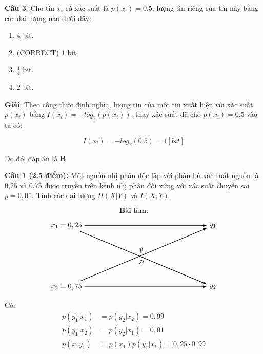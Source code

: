 \documentclass[12pt]{article}
\begin{document}
\newpage
\textbf{Câu 3}: Cho tin $x_i$ có xác suất là $p(x_i)=0.5$, lượng tin riêng của tin này bằng các đại lượng nào dưới đây:

 \begin{enumerate}[label=\Alph*.]
    \item $4$ bit.
    \item (CORRECT) $1$ bit.
    \item $\frac{1}{4}$ bit.
    \item $2$ bit.
 \end{enumerate}


\textbf{Giải}: Theo công thức định nghĩa, lượng tin của một tin xuất hiện với xác suất $p(x_i)$ bằng $I(x_i)=-log_2(p(x_i))$, thay xác suất đã cho $p(x_i)=0.5$ vào ta có:

$$ I(x_i) = - log_2(0.5) = 1 [bit]$$

Do đó, đáp án là \textbf{B}

\newpage

\textbf{Câu 1 (2.5 điểm):} Một nguồn nhị phân độc lập với phân bố xác suất nguồn là 0{,}25 và 0{,}75 được truyền trên kênh nhị phân đối xứng với xác suất chuyển sai $p = 0{,}01$. Tính các đại lượng $H(X|Y)$ và $I(X;Y)$. 

\[
\textbf{Bài làm:}
\]

\[
\begin{tikzpicture}[>=latex, thick]

\node[left] (x1) at (0,3) {$x_1 = 0,25 $};
\node[left] (x2) at (0,0) {$x_2 = 0,75 $};

\node[right] (y1) at (6,3) {$y_1$};
\node[right] (y2) at (6,0) {$y_2$};

\draw[->] (x1) -- (y1) node[midway, above] {};
\draw[->] (x1) -- (y2) node[midway, sloped, below] {$p$};

\draw[->] (x2) -- (y1) node[midway, sloped, above] {$p$};
\draw[->] (x2) -- (y2) node[midway, sloped, below] {};
\end{tikzpicture}
\]

Có: 
\[
\begin{aligned}
p(y_1|x_1) &= p(y_2|x_2) = 0{,}99 \\
p(y_1|x_2) &= p(y_2|x_1) = 0{,}01 \\
p(x_1 y_1) &= p(x_1) p(y_1|x_1) = 0{,}25 \cdot 0{,}99
\end{aligned}
\]
\end{document}
